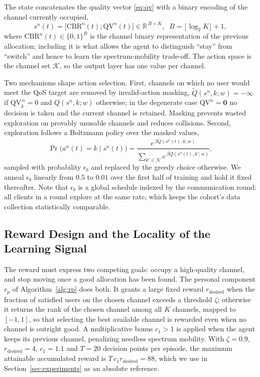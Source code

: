 \documentclass[journal]{IEEEtran}
\begin{document}
The state concatenates the quality vector \eqref{eq:qv} with a binary encoding
of the channel currently occupied,
\begin{equation}
s^{n}(t) = \bigl[\mathrm{CBR}^{n}(t); \mathrm{QV}^{n}(t)\bigr]
  \in \mathbb{R}^{\,B+K},\;\; B = \lfloor \log_{2}K \rfloor + 1 ,
\label{eq:state}
\end{equation}
where $\mathrm{CBR}^{n}(t)\in\{0,1\}^{B}$ is the channel binary representation
of the previous allocation; including it is what allows the agent to
distinguish ``stay'' from ``switch'' and hence to learn the spectrum-mobility
trade-off. The action space is the channel set $\mathcal{K}$, so the output
layer has one value per channel.

Two mechanisms shape action selection. First, channels on which no user would
meet the QoS target are removed by invalid-action masking,
$\widetilde{Q}(s^{n},k;w) = -\infty$ if $\mathrm{QV}^{\,n}_{k}=0$ and
$Q(s^{n},k;w)$ otherwise; in the degenerate case
$\mathrm{QV}^{n}=\mathbf{0}$ no decision is taken and the current channel is
retained. Masking prevents wasted exploration on provably unusable channels and
reduces collisions. Second, exploration follows a Boltzmann policy over the
masked values,
\begin{equation}
\Pr\bigl(a^{n}(t)=k \mid s^{n}(t)\bigr)
 = \frac{e^{\,\beta \widetilde{Q}(s^{n}(t),k;w)}}
        {\sum_{k'\in\mathcal{K}} e^{\,\beta \widetilde{Q}(s^{n}(t),k';w)}},
\label{eq:explore}
\end{equation}
sampled with probability $\epsilon_{b}$ and replaced by the greedy choice
otherwise. We anneal $\epsilon_{b}$ linearly from $0.5$ to $0.01$ over the first
half of training and hold it fixed thereafter. Note that $\epsilon_{b}$ is a
global schedule indexed by the communication round: all clients in a round
explore at the same rate, which keeps the cohort's data collection
statistically comparable.

\subsection{Reward Design and the Locality of the Learning Signal}
\label{subsec:method_reward}

The reward must express two competing goals: occupy a high-quality channel, and
stop moving once a good allocation has been found. The personal component
$r_{p}$ of Algorithm~\ref{alg:rp} does both. It grants a large fixed reward
$r_{\mathrm{desired}}$ when the fraction of satisfied users on the chosen
channel exceeds a threshold $\zeta$; otherwise it returns the rank of the
chosen channel among all $K$ channels, mapped to $[-1,1]$, so that selecting
the best available channel is rewarded even when no channel is outright good. A
multiplicative bonus $c_{1}>1$ is applied when the agent keeps its previous
channel, penalizing needless spectrum mobility. With $\zeta=0.9$,
$r_{\mathrm{desired}}=4$, $c_{1}=1.1$ and $T=20$ decision points per episode,
the maximum attainable accumulated reward is
$T\,c_{1}r_{\mathrm{desired}}=88$, which we use in
Section~\ref{sec:experiments} as an absolute reference.
\end{document}
